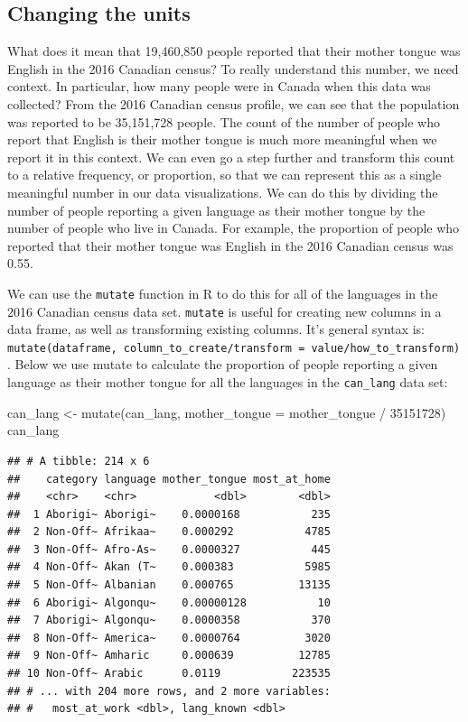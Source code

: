 \documentclass[
]{krantz}
\makeatletter
\newenvironment{Shaded}{\begin{snugshade}}{\end{snugshade}}
\newcommand{\AttributeTok}[1]{\textcolor[rgb]{0.61,0.61,0.61}{#1}}
\newcommand{\DecValTok}[1]{\textcolor[rgb]{0.06,0.06,0.06}{#1}}
\newcommand{\FunctionTok}[1]{\textcolor[rgb]{0,0,0}{#1}}
\newcommand{\NormalTok}[1]{#1}
\newcommand{\OtherTok}[1]{\textcolor[rgb]{0.37,0.37,0.37}{#1}}
\newcommand{\SpecialCharTok}[1]{\textcolor[rgb]{0,0,0}{#1}}
\newenvironment{kframe}{%
\medskip{}
\setlength{\fboxsep}{.8em}
 \def\at@end@of@kframe{}%
 \ifinner\ifhmode%
  \def\at@end@of@kframe{\end{minipage}}%
  \begin{minipage}{\columnwidth}%
 \fi\fi%
 \def\FrameCommand##1{\hskip\@totalleftmargin \hskip-\fboxsep
 \colorbox{shadecolor}{##1}\hskip-\fboxsep
     \hskip-\linewidth \hskip-\@totalleftmargin \hskip\columnwidth}%
 \MakeFramed {\advance\hsize-\width
   \@totalleftmargin\z@ \linewidth\hsize
   \@setminipage}}%
 {\par\unskip\endMakeFramed%
 \at@end@of@kframe}
\renewenvironment{Shaded}{\begin{kframe}}{\end{kframe}}
\makeatother
\begin{document}
\hypertarget{changing-the-units}{%
\subsection{Changing the units}\label{changing-the-units}}

What does it mean that 19,460,850
people reported that their mother tongue was English in the 2016 Canadian
census? To really understand this number, we need context. In particular, how
many people were in Canada when this data was collected? From the 2016 Canadian
census profile, we can see that the population was reported to be
35,151,728 people. The count of
the number of people who report that English is their mother tongue is much more
meaningful when we report it in this context. We can even go a step further and
transform this count to a relative frequency, or proportion, so that we can
represent this as a single meaningful number in our data visualizations. We can
do this by dividing the number of people reporting a given language as their
mother tongue by the number of people who live in Canada. For example, the
proportion of people who reported that their mother tongue was English in the
2016 Canadian census was
0.55.

We can use the \texttt{mutate} function in R to do this for all of the languages in the 2016 Canadian census data set. \texttt{mutate} is useful for creating new columns in a data frame, as well as transforming existing columns. It's general syntax is: \texttt{mutate(dataframe,\ column\_to\_create/transform\ =\ value/how\_to\_transform)}. Below we use mutate to calculate the proportion of people reporting a given language as their mother tongue for all the languages in the \texttt{can\_lang} data set:

\begin{Shaded}
\begin{Highlighting}[]
\NormalTok{can\_lang }\OtherTok{\textless{}{-}} \FunctionTok{mutate}\NormalTok{(can\_lang, }\AttributeTok{mother\_tongue =}\NormalTok{ mother\_tongue }\SpecialCharTok{/} \DecValTok{35151728}\NormalTok{)}
\NormalTok{can\_lang}
\end{Highlighting}
\end{Shaded}

\begin{verbatim}
## # A tibble: 214 x 6
##    category language mother_tongue most_at_home
##    <chr>    <chr>            <dbl>        <dbl>
##  1 Aborigi~ Aborigi~    0.0000168           235
##  2 Non-Off~ Afrikaa~    0.000292           4785
##  3 Non-Off~ Afro-As~    0.0000327           445
##  4 Non-Off~ Akan (T~    0.000383           5985
##  5 Non-Off~ Albanian    0.000765          13135
##  6 Aborigi~ Algonqu~    0.00000128           10
##  7 Aborigi~ Algonqu~    0.0000358           370
##  8 Non-Off~ America~    0.0000764          3020
##  9 Non-Off~ Amharic     0.000639          12785
## 10 Non-Off~ Arabic      0.0119           223535
## # ... with 204 more rows, and 2 more variables:
## #   most_at_work <dbl>, lang_known <dbl>
\end{verbatim}
\end{document}
